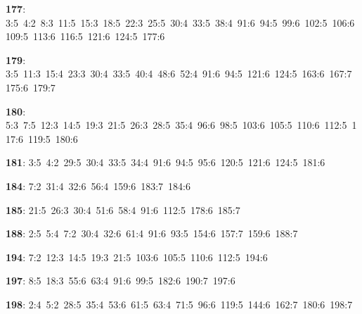 \noindent \textbf{177}: 3:5\allowbreak\ 4:2\allowbreak\ 8:3\allowbreak\ 11:5\allowbreak\ 15:3\allowbreak\ 18:5\allowbreak\ 22:3\allowbreak\ 25:5\allowbreak\ 30:4\allowbreak\ 33:5\allowbreak\ 38:4\allowbreak\ 91:6\allowbreak\ 94:5\allowbreak\ 99:6\allowbreak\ 102:5\allowbreak\ 106:6\allowbreak\ 109:5\allowbreak\ 113:6\allowbreak\ 116:5\allowbreak\ 121:6\allowbreak\ 124:5\allowbreak\ 177:6\par
\noindent \textbf{179}: 3:5\allowbreak\ 11:3\allowbreak\ 15:4\allowbreak\ 23:3\allowbreak\ 30:4\allowbreak\ 33:5\allowbreak\ 40:4\allowbreak\ 48:6\allowbreak\ 52:4\allowbreak\ 91:6\allowbreak\ 94:5\allowbreak\ 121:6\allowbreak\ 124:5\allowbreak\ 163:6\allowbreak\ 167:7\allowbreak\ 175:6\allowbreak\ 179:7\par
\noindent \textbf{180}: 5:3\allowbreak\ 7:5\allowbreak\ 12:3\allowbreak\ 14:5\allowbreak\ 19:3\allowbreak\ 21:5\allowbreak\ 26:3\allowbreak\ 28:5\allowbreak\ 35:4\allowbreak\ 96:6\allowbreak\ 98:5\allowbreak\ 103:6\allowbreak\ 105:5\allowbreak\ 110:6\allowbreak\ 112:5\allowbreak\ 117:6\allowbreak\ 119:5\allowbreak\ 180:6\par
\noindent \textbf{181}: 3:5\allowbreak\ 4:2\allowbreak\ 29:5\allowbreak\ 30:4\allowbreak\ 33:5\allowbreak\ 34:4\allowbreak\ 91:6\allowbreak\ 94:5\allowbreak\ 95:6\allowbreak\ 120:5\allowbreak\ 121:6\allowbreak\ 124:5\allowbreak\ 181:6\par
\noindent \textbf{184}: 7:2\allowbreak\ 31:4\allowbreak\ 32:6\allowbreak\ 56:4\allowbreak\ 159:6\allowbreak\ 183:7\allowbreak\ 184:6\par
\noindent \textbf{185}: 21:5\allowbreak\ 26:3\allowbreak\ 30:4\allowbreak\ 51:6\allowbreak\ 58:4\allowbreak\ 91:6\allowbreak\ 112:5\allowbreak\ 178:6\allowbreak\ 185:7\par
\noindent \textbf{188}: 2:5\allowbreak\ 5:4\allowbreak\ 7:2\allowbreak\ 30:4\allowbreak\ 32:6\allowbreak\ 61:4\allowbreak\ 91:6\allowbreak\ 93:5\allowbreak\ 154:6\allowbreak\ 157:7\allowbreak\ 159:6\allowbreak\ 188:7\par
\noindent \textbf{194}: 7:2\allowbreak\ 12:3\allowbreak\ 14:5\allowbreak\ 19:3\allowbreak\ 21:5\allowbreak\ 103:6\allowbreak\ 105:5\allowbreak\ 110:6\allowbreak\ 112:5\allowbreak\ 194:6\par
\noindent \textbf{197}: 8:5\allowbreak\ 18:3\allowbreak\ 55:6\allowbreak\ 63:4\allowbreak\ 91:6\allowbreak\ 99:5\allowbreak\ 182:6\allowbreak\ 190:7\allowbreak\ 197:6\par
\noindent \textbf{198}: 2:4\allowbreak\ 5:2\allowbreak\ 28:5\allowbreak\ 35:4\allowbreak\ 53:6\allowbreak\ 61:5\allowbreak\ 63:4\allowbreak\ 71:5\allowbreak\ 96:6\allowbreak\ 119:5\allowbreak\ 144:6\allowbreak\ 162:7\allowbreak\ 180:6\allowbreak\ 198:7\par
